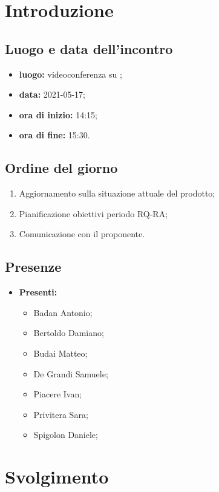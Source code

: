 \section*{Introduzione}
\subsection*{Luogo e data dell'incontro}
\begin{itemize}
	\item \textbf{luogo:} videoconferenza su ;
	\item \textbf{data:} 2021-05-17;
	\item \textbf{ora di inizio:} 14:15;
	\item \textbf{ora di fine:} 15:30.
\end{itemize}

\subsection*{Ordine del giorno}
\begin{enumerate}
	\item Aggiornamento sulla situazione attuale del prodotto;
	\item Pianificazione obiettivi periodo RQ-RA;
	\item Comunicazione con il proponente.
		
\end{enumerate}

\subsection*{Presenze}
\begin{itemize}
	\item \textbf{Presenti: }
	\begin{itemize}
		\item Badan Antonio;
		\item Bertoldo Damiano;
		\item Budai Matteo;
		\item De Grandi Samuele;
		\item Piacere Ivan;
		\item Privitera Sara;
		\item Spigolon Daniele;
	\end{itemize}
\end{itemize}


\section*{Svolgimento}

